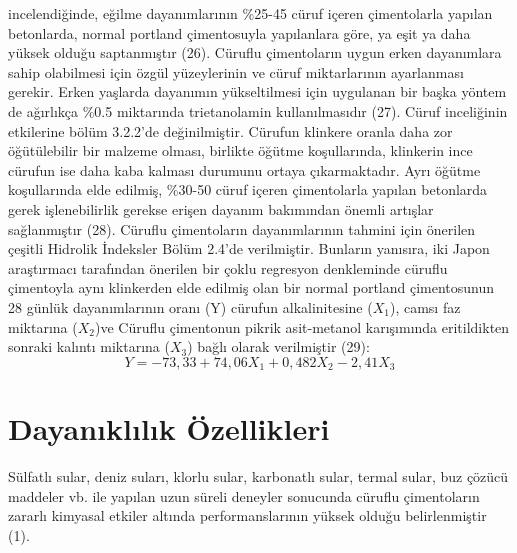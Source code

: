 \documentclass[12pt]{article}
\begin{document}
incelendiğinde, eğilme dayanımlarının \%25-45 cüruf içeren çimentolarla
yapılan betonlarda, normal portland çimentosuyla yapılanlara göre, ya eşit
ya daha yüksek olduğu saptanmıştır (26).
Cüruflu çimentoların uygun erken dayanımlara sahip olabilmesi için özgül
yüzeylerinin ve cüruf miktarlarının ayarlanması gerekir. Erken yaşlarda
dayanımın yükseltilmesi için uygulanan bir başka yöntem de ağırlıkça \%0.5
miktarında trietanolamin kullanılmasıdır (27).
Cüruf inceliğinin etkilerine bölüm 3.2.2’de değinilmiştir. Cürufun klinkere
oranla daha zor öğütülebilir bir malzeme olması, birlikte öğütme koşullarında,
klinkerin ince cürufun ise daha kaba kalması durumunu ortaya çıkarmaktadır.
Ayrı öğütme koşullarında elde edilmiş, \%30-50 cüruf içeren çimentolarla
yapılan betonlarda gerek işlenebilirlik gerekse erişen dayanım bakımından
önemli artışlar sağlanmıştır (28).
Cüruflu çimentoların dayanımlarının tahmini için önerilen çeşitli Hidrolik
İndeksler Bölüm 2.4’de verilmiştir. Bunların yanısıra, iki Japon araştırmacı
tarafından önerilen bir çoklu regresyon denkleminde cüruflu çimentoyla aynı
klinkerden elde edilmiş olan bir normal portland çimentosunun 28 günlük
dayanımlarının oranı (Y) cürufun alkalinitesine ($X_1$), camsı faz miktarına ($X_2$)ve Cüruflu çimentonun pikrik asit-metanol karışımında eritildikten sonraki
kalıntı miktarına ($X_3$) bağlı olarak verilmiştir (29):
\begin{equation}
Y= -73,33 + 74,06X_1 + 0,482X_2 - 2,41X_3
\end{equation}

\section{Dayanıklılık Özellikleri}
Sülfatlı sular, deniz suları, klorlu sular, karbonatlı sular, termal sular, buz
çözücü maddeler vb. ile yapılan uzun süreli deneyler sonucunda cüruflu
çimentoların zararlı kimyasal etkiler altında performanslarının yüksek olduğu
belirlenmiştir (1).
\end{document}
